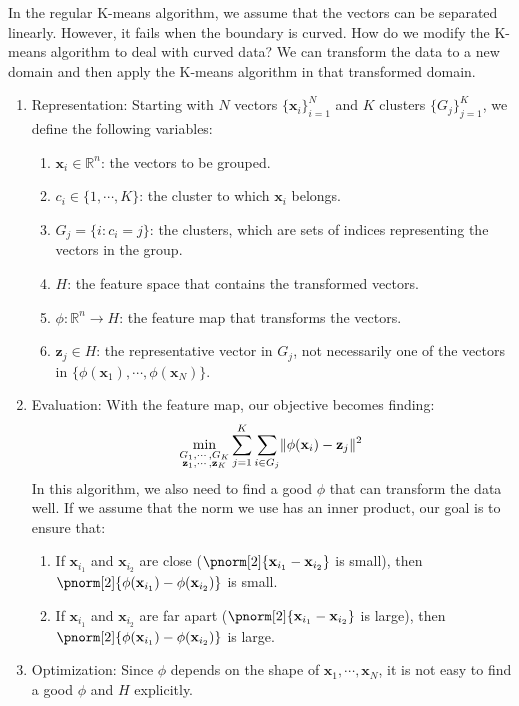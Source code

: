\documentclass{huhtakm-template-book-v2}
\begin{document}
    In the regular K-means algorithm, we assume that the vectors can be separated linearly. However, it fails when the boundary is curved. How do we modify the K-means algorithm to deal with curved data? We can transform the data to a new domain and then apply the K-means algorithm in that transformed domain.
    \begin{enumerate}
        \item Representation: Starting with $N$ vectors $\{\mathbf{x}_{i}\}_{i=1}^{N}$ and $K$ clusters $\{G_{j}\}_{j=1}^{K}$, we define the following variables:
        \begin{enumerate}
            \item $\mathbf{x}_{i}\in\mathbb{R}^{n}$: the vectors to be grouped.
            \item $c_{i}\in\{1,\cdots,K\}$: the cluster to which $\mathbf{x}_{i}$ belongs.
            \item $G_{j}=\{i:c_{i}=j\}$: the clusters, which are sets of indices representing the vectors in the group.
            \item $H$: the feature space that contains the transformed vectors.
            \item $\phi: \mathbb{R}^{n}\to H$: the feature map that transforms the vectors.
            \item $\mathbf{z}_{j}\in H$: the representative vector in $G_{j}$, not necessarily one of the vectors in $\{\phi(\mathbf{x}_{1}),\cdots,\phi(\mathbf{x}_{N})\}$.
        \end{enumerate}
        \item Evaluation: With the feature map, our objective becomes finding: 
        \begin{equation*}
            \min_{\substack{G_{1},\cdots,G_{K}\\\mathbf{z}_{1},\cdots,\mathbf{z}_{K}}}\sum_{j=1}^{K}\sum_{i\in G_{j}}\lVert{\phi(\mathbf{x}_{i})-\mathbf{z}_{j}}\rVert^{2}
        \end{equation*}
        In this algorithm, we also need to find a good $\phi$ that can transform the data well. If we assume that the norm we use has an inner product, our goal is to ensure that:
        \begin{enumerate}
            \item If $\mathbf{x}_{i_{1}}$ and $\mathbf{x}_{i_{2}}$ are close ($\pnorm[2]{\mathbf{x}_{i_{1}}-\mathbf{x}_{i_{2}}}$ is small), then $\pnorm[2]{\phi(\mathbf{x}_{i_{1}})-\phi(\mathbf{x}_{i_{2}})}$ is small.
            \item If $\mathbf{x}_{i_{1}}$ and $\mathbf{x}_{i_{2}}$ are far apart ($\pnorm[2]{\mathbf{x}_{i_{1}}-\mathbf{x}_{i_{2}}}$ is large), then $\pnorm[2]{\phi(\mathbf{x}_{i_{1}})-\phi(\mathbf{x}_{i_{2}})}$ is large.
        \end{enumerate}
        \item Optimization: Since $\phi$ depends on the shape of $\mathbf{x}_{1},\cdots,\mathbf{x}_{N}$, it is not easy to find a good $\phi$ and $H$ explicitly. 
        

\end{enumerate}
\end{document}
